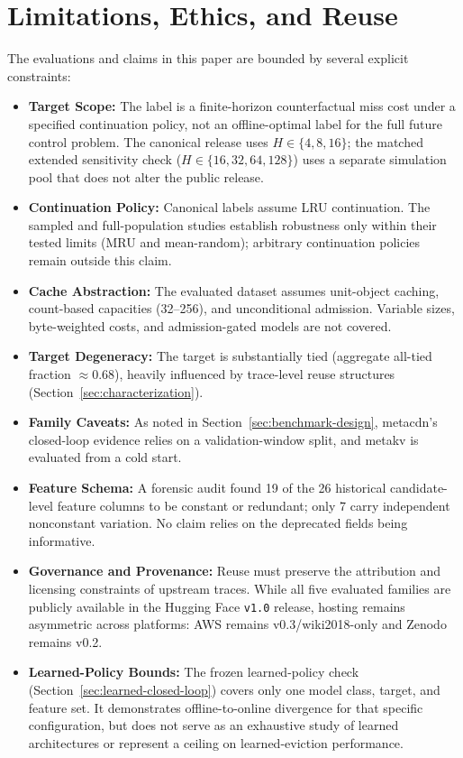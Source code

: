 \section{Limitations, Ethics, and Reuse}
\label{sec:limitations}

The evaluations and claims in this paper are bounded by several explicit constraints:

\begin{itemize}[leftmargin=*]
  \item \textbf{Target Scope:} The label is a finite-horizon counterfactual miss cost under a specified continuation policy, not an offline-optimal label for the full future control problem. The canonical release uses $H\in\{4,8,16\}$; the matched extended sensitivity check ($H\in\{16,32,64,128\}$) uses a separate simulation pool that does not alter the public release.
  \item \textbf{Continuation Policy:} Canonical labels assume LRU continuation. The sampled and full-population studies establish robustness only within their tested limits (MRU and mean-random); arbitrary continuation policies remain outside this claim.
  \item \textbf{Cache Abstraction:} The evaluated dataset assumes unit-object caching, count-based capacities (32--256), and unconditional admission. Variable sizes, byte-weighted costs, and admission-gated models are not covered.
  \item \textbf{Target Degeneracy:} The target is substantially tied (aggregate all-tied fraction $\approx$0.68), heavily influenced by trace-level reuse structures (Section~\ref{sec:characterization}).
  \item \textbf{Family Caveats:} As noted in Section~\ref{sec:benchmark-design}, metacdn's closed-loop evidence relies on a validation-window split, and metakv is evaluated from a cold start.
  \item \textbf{Feature Schema:} A forensic audit found 19 of the 26 historical candidate-level feature columns to be constant or redundant; only 7 carry independent nonconstant variation. No claim relies on the deprecated fields being informative.
  \item \textbf{Governance and Provenance:} Reuse must preserve the attribution and licensing constraints of upstream traces. While all five evaluated families are publicly available in the Hugging Face \texttt{v1.0} release, hosting remains asymmetric across platforms: AWS remains v0.3/wiki2018-only and Zenodo remains v0.2.
  \item \textbf{Learned-Policy Bounds:} The frozen learned-policy check (Section~\ref{sec:learned-closed-loop}) covers only one model class, target, and feature set. It demonstrates offline-to-online divergence for that specific configuration, but does not serve as an exhaustive study of learned architectures or represent a ceiling on learned-eviction performance.
\end{itemize}
